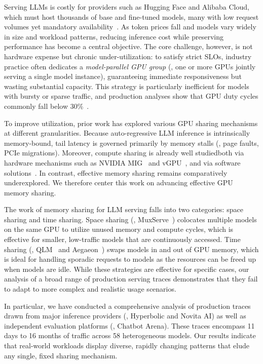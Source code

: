 
Serving LLMs is costly for providers such as Hugging Face and Alibaba Cloud, which must host thousands of base and fine-tuned models, many with low request volumes yet mandatory availability~\cite{aegaeon, slora, xiang2025}. As token prices fall and models vary widely in size and workload patterns, reducing inference cost while preserving performance has become a central objective. The core challenge, however, is not hardware expense but chronic under-utilization: to satisfy strict SLOs, industry practice often dedicates a \emph{model-parallel GPU group} (\ie, one or more GPUs jointly serving a single model instance), guaranteeing immediate responsiveness but wasting substantial capacity. This strategy is particularly inefficient for models with bursty or sparse traffic, and production analyses show that GPU duty cycles commonly fall below 30\%~\cite{aegaeon, xiang2025}.

To improve utilization, prior work has explored various GPU sharing mechanisms at different granularities. 
Because auto-regressive LLM inference is intrinsically memory-bound, tail latency is governed primarily by memory stalls (\eg, page faults, PCIe migrations). 
Moreover, compute sharing is already well studied\textemdash both via hardware mechanisms such as NVIDIA MIG~\cite{nvidiaMIG} and vGPU~\cite{nvidia-vgpu}, and via software solutions~\cite{nvidiaMPS,tally@asplos23,fu2024serverlessllm,lithos@sosp25,gpreempt@atc25,xsched@osdi25}. In contrast, effective memory sharing remains comparatively underexplored. We therefore center this work on advancing effective GPU memory sharing.

The work of memory sharing for LLM serving falls into two categories: space sharing and time sharing. 
Space sharing (\eg, MuxServe~\cite{muxserve}) colocates multiple models on the same GPU to utilize unused memory and compute cycles, which is effective for smaller, low-traffic models that are continuously accessed. Time sharing (\eg, QLM~\cite{qlm} and Aegaeon~\cite{aegaeon}) swaps models in and out of GPU memory, which is ideal for handling sporadic requests to models as the resources can be freed up when models are idle. While these strategies are effective for specific cases, our analysis of a broad range of production serving traces demonstrates that they fail to adapt to more complex and realistic usage scenarios. 

In particular, we have conducted a comprehensive analysis of production traces drawn from major inference providers (\ie, Hyperbolic and Novita AI) as well as independent evaluation platforms (\ie, Chatbot Arena). These traces encompass 11 days to 16 months of traffic across 58 heterogeneous models. Our results indicate that real-world workloads display diverse, rapidly changing patterns that elude any single, fixed sharing mechanism. 

